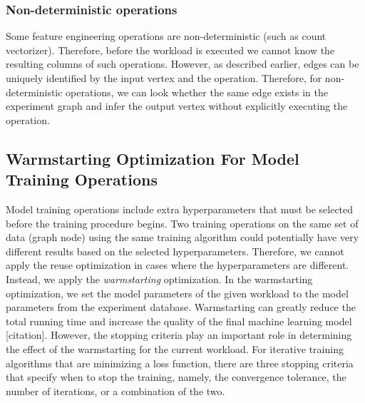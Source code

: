 \subsubsection{Non-deterministic operations}
Some feature engineering operations are non-deterministic (such as count vectorizer).
Therefore, before the workload is executed we cannot know the resulting columns of such operations.
However, as described earlier, edges can be uniquely identified by the input vertex and the operation.
Therefore, for non-deterministic operations, we can look whether the same edge exists in the experiment graph and infer the output vertex without explicitly executing the operation.


\subsection{Warmstarting Optimization For Model Training Operations}
Model training operations include extra hyperparameters that must be selected before the training procedure begins.
Two training operations on the same set of data (graph node) using the same training algorithm could potentially have very different results based on the selected hyperparameters.
Therefore, we cannot apply the reuse optimization in cases where the hyperparameters are different.
Instead, we apply the \textit{warmstarting} optimization.
In the warmstarting optimization, we set the model parameters of the given workload to the model parameters from the experiment database.
Warmstarting can greatly reduce the total running time and increase the quality of the final machine learning model [citation].
However, the stopping criteria play an important role in determining the effect of the warmstarting for the current workload.
For iterative training algorithms that are minimizing a loss function, there are three stopping criteria that specify when to stop the training, namely, the convergence tolerance, the number of iterations, or a combination of the two.

